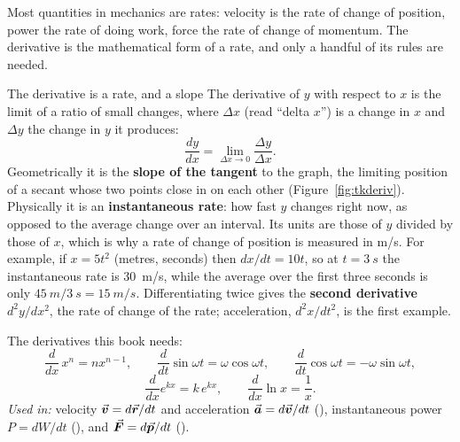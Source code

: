 Most quantities in mechanics are rates: velocity is the rate of change of position, power the rate of doing
work, force the rate of change of momentum. The derivative is the mathematical form of a rate, and only a
handful of its rules are needed.

\begin{defbox}{The derivative is a rate, and a slope}
The derivative of $y$ with respect to $x$ is the limit of a ratio of small changes, where $\Delta x$
(read ``delta $x$'') is a change in $x$ and $\Delta y$ the change in $y$ it produces:
\[
\frac{dy}{dx}=\lim_{\Delta x\to0}\frac{\Delta y}{\Delta x}.
\]
Geometrically it is the \textbf{slope of the tangent} to the graph, the limiting position of a secant
whose two points close in on each other (Figure~\ref{fig:tkderiv}). Physically it is an
\textbf{instantaneous rate}: how fast $y$ changes right now, as opposed to the average change over an
interval. Its units are those of $y$ divided by those of $x$, which is why a rate of change of position
is measured in \si{m/s}. For example, if $x=5t^{2}$ (metres, seconds) then $dx/dt=10t$, so at
$t=\SI{3}{s}$ the instantaneous rate is \SI{30}{m/s}, while the average over the first three seconds is
only $\SI{45}{m}/\SI{3}{s}=\SI{15}{m/s}$. Differentiating twice gives the \textbf{second derivative}
$d^{2}y/dx^{2}$, the rate of change of the rate; acceleration, $d^{2}x/dt^{2}$, is the first example.

The derivatives this book needs:
\[
\frac{d}{dx}\,x^{n}=nx^{n-1},\qquad
\frac{d}{dt}\sin\omega t=\omega\cos\omega t,\qquad
\frac{d}{dt}\cos\omega t=-\omega\sin\omega t,
\]
\[
\frac{d}{dx}e^{kx}=k\,e^{kx},\qquad \frac{d}{dx}\ln x=\frac{1}{x}.
\]
\emph{Used in:} velocity $\vec{\bm{v}}=d\vec{\bm{r}}/dt$ and acceleration $\vec{\bm{a}}=d\vec{\bm{v}}/dt$ (), instantaneous
power $P=dW/dt$ (), and $\vec{\bm{F}}=d\vec{\bm{p}}/dt$ ().
\end{defbox}

\begin{figure}[htbp]
\centering
{}
\end{figure}

